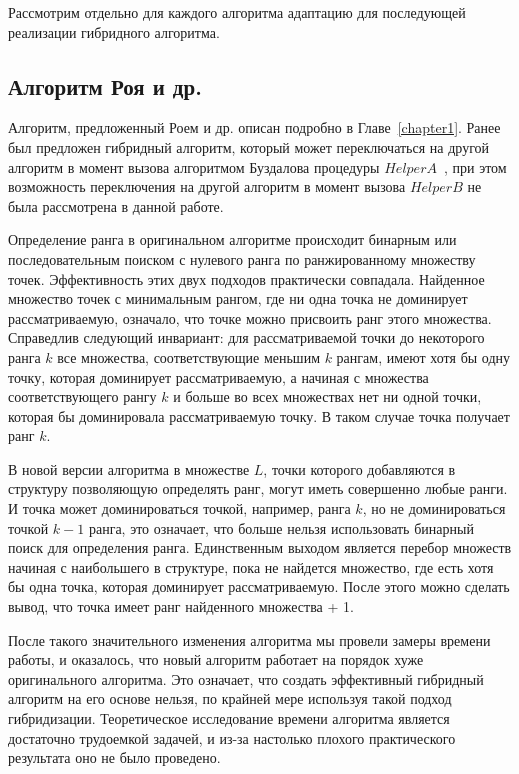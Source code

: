 Рассмотрим отдельно для каждого алгоритма адаптацию для последующей реализации гибридного алгоритма.

\subsection{Алгоритм Роя и др.}

Алгоритм, предложенный Роем и др. описан подробно в Главе~\ref{chapter1}. Ранее был предложен гибридный алгоритм, который может переключаться на другой алгоритм в момент вызова алгоритмом Буздалова процедуры $HelperA$~\cite{Markina}, при этом возможность переключения на другой алгоритм в момент вызова $HelperB$ не была рассмотрена в данной работе. 

Определение ранга в оригинальном алгоритме происходит бинарным или последовательным поиском с нулевого ранга по ранжированному множеству точек. Эффективность этих двух подходов практически совпадала. Найденное множество точек с минимальным рангом, где ни одна точка не доминирует рассматриваемую, означало, что точке можно присвоить ранг этого множества. Справедлив следующий инвариант: для рассматриваемой точки до некоторого ранга $k$ все множества, соответствующие меньшим $k$ рангам, имеют хотя бы одну точку, которая доминирует рассматриваемую, а начиная с множества соответствующего рангу $k$ и больше во всех множествах нет ни одной точки, которая бы доминировала рассматриваемую точку. В таком случае точка получает ранг $k$. 

В новой версии алгоритма в множестве $L$, точки которого добавляются в структуру позволяющую определять ранг, могут иметь совершенно любые ранги. И точка может доминироваться точкой, например, ранга $k$, но не доминироваться точкой $k-1$ ранга, это означает, что больше нельзя использовать бинарный поиск для определения ранга. Единственным выходом является перебор множеств начиная с наибольшего в структуре, пока не найдется множество, где есть хотя бы одна точка, которая доминирует рассматриваемую. После этого можно сделать вывод, что точка имеет ранг найденного множества + 1. 

После такого значительного изменения алгоритма мы провели замеры времени работы, и оказалось, что новый алгоритм работает на порядок хуже оригинального алгоритма. Это означает, что создать эффективный гибридный алгоритм на его основе нельзя, по крайней мере используя такой подход гибридизации. Теоретическое исследование времени алгоритма является достаточно трудоемкой задачей, и из-за настолько плохого практического результата оно не было проведено. 

